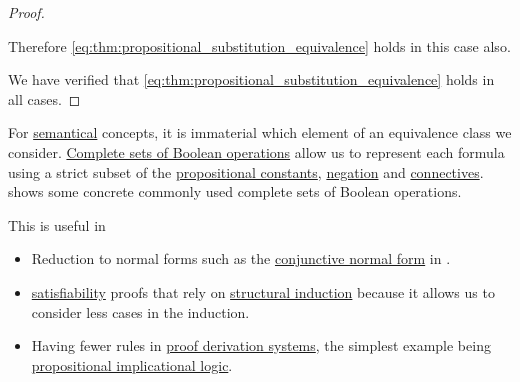 \begin{proof}
\begin{itemize}
    Therefore \eqref{eq:thm:propositional_substitution_equivalence} holds in this case also.
  \end{itemize}

  We have verified that \eqref{eq:thm:propositional_substitution_equivalence} holds in all cases.
\end{proof}

\begin{remark}\label{rem:smaller_propositional_language}
  For \hyperref[def:propositional_semantics]{semantical} concepts, it is immaterial which element of an equivalence class we consider. \hyperref[def:boolean_closure]{Complete sets of Boolean operations} allow us to represent each formula using a strict subset of the \hyperref[def:propositional_language/constants]{propositional constants}, \hyperref[def:propositional_language/negation]{negation} and \hyperref[def:propositional_language/connectives]{connectives}.  shows some concrete commonly used complete sets of Boolean operations.

  This is useful in
  \begin{itemize}
    \item Reduction to normal forms such as the \hyperref[def:conjunctive_disjunctive_normal_form]{conjunctive normal form} in .

    \item \hyperref[def:propositional_semantics/satisfiability]{satisfiability} proofs that rely on \hyperref[rem:induction]{structural induction} because it allows us to consider less cases in the induction.

    \item Having fewer rules in \hyperref[alg:conjunctive_normal_form_reduction]{proof derivation systems}, the simplest example being \hyperref[def:propositional_implicational_logic]{propositional implicational logic}.
  \end{itemize}
\end{remark}

